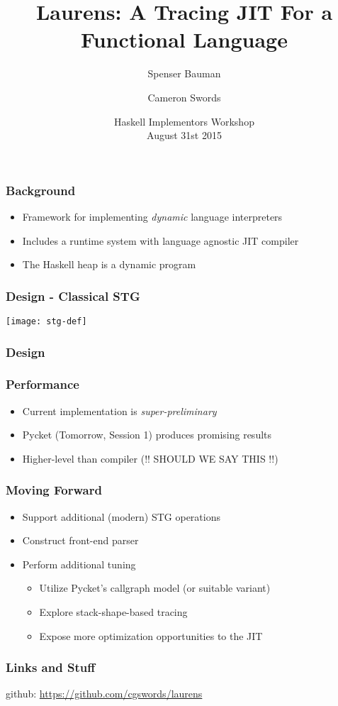 \documentclass[xetex,serif,mathserif]{beamer}
\title{Laurens: A Tracing JIT For a Functional Language}
\author[shortname]{Spenser Bauman \and Cameron Swords}
\institute[shortinst]{
    Indiana University Bloomington, USA
}
\date{Haskell Implementors Workshop \\ August 31st 2015}
\newenvironment{slide}[1]{\begin{frame}\frametitle{#1}}{\end{frame}}
\begin{document}
\frame{\titlepage}

\begin{slide}{Background}
  \begin{itemize}
    \item Framework for implementing \emph{dynamic} language interpreters
    \item Includes a runtime system with language agnostic JIT compiler
    \item The Haskell heap is a dynamic program
  \end{itemize}
\end{slide}

\begin{slide}{Design - Classical STG}
  \begin{center}
  \texttt{[image: stg-def]}
  \end{center}
\end{slide}

\begin{slide}{Design}
\end{slide}

\begin{slide}{Performance}
  \begin{itemize}
    \item Current implementation is \emph{super-preliminary}
    \item Pycket (Tomorrow, Session 1) produces promising results
    \item Higher-level than compiler  (!! SHOULD WE SAY THIS !!)
  \end{itemize}
\end{slide}

\begin{slide}{Moving Forward}
  \begin{itemize}
    \item Support additional (modern) STG operations
    \item Construct front-end parser
    \item Perform additional tuning
    \begin{itemize}
      \item Utilize Pycket's callgraph model (or suitable variant)
      \item Explore stack-shape-based tracing
      \item Expose more optimization opportunities to the JIT
    \end{itemize}
  \end{itemize}
\end{slide}

\begin{slide}{Links and Stuff}
    \begin{center}
        github: \href{https://github.com/cgswords/laurens}{https://github.com/cgswords/laurens}
    \end{center}
\end{slide}
\end{document}
